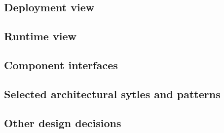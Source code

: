 \documentclass[../DD0.tex]{subfiles}
\begin{document}
  \subsection{Deployment view}
  \label{sec:deplview}

  \subsection{Runtime view}
  \label{sec:runtview}

  \subsection{Component interfaces}
  \label{sec:compinterf}

  \subsection{Selected architectural sytles and patterns}
  \label{sec:stylesandpatterns}

  \subsection{Other design decisions}
  \label{sec:designdecisions}
\end{document}
